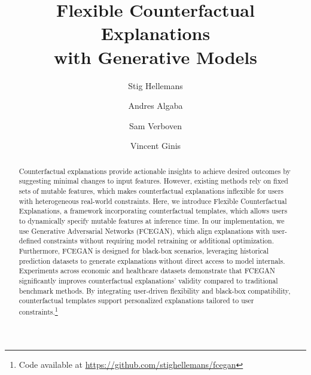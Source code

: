\documentclass[runningheads]{llncs}
\begin{document}
\title{Flexible Counterfactual Explanations \\ with Generative Models}


\author{Stig Hellemans \and
Andres Algaba \and
Sam Verboven \and
Vincent Ginis}

\titlerunning{ }
\authorrunning{ }

%
\maketitle              %
%

\renewcommand{\thefootnote}{*}

\begin{abstract}
Counterfactual explanations provide actionable insights to achieve desired outcomes by suggesting minimal changes to input features. However, existing methods rely on fixed sets of mutable features, which makes counterfactual explanations inflexible for users with heterogeneous real-world constraints. Here, we introduce Flexible Counterfactual Explanations, a framework incorporating counterfactual templates, which allows users to dynamically specify mutable features at inference time. In our implementation, we use Generative Adversarial Networks (FCEGAN), which align explanations with user-defined constraints without requiring model retraining or additional optimization. Furthermore, FCEGAN is designed for black-box scenarios, leveraging historical prediction datasets to generate explanations without direct access to model internals. Experiments across economic and healthcare datasets demonstrate that FCEGAN significantly improves counterfactual explanations' validity compared to traditional benchmark methods. By integrating user-driven flexibility and black-box compatibility, counterfactual templates support personalized explanations tailored to user constraints.\footnote{Code available at \url{https://github.com/stighellemans/fcegan}}


\end{abstract}
\end{document}
